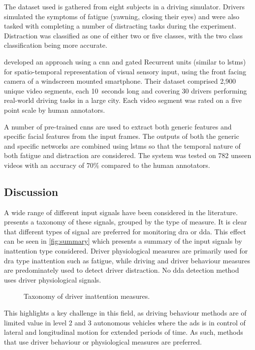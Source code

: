 \documentclass[11pt, parskip=half*,twoside=false]{scrbook}
\begin{document}
The dataset used is gathered from eight subjects in a driving simulator. Drivers simulated the symptoms of fatigue (yawning, closing their eyes) and were also tasked with completing a number of distracting tasks during the experiment. Distraction was classified as one of either two or five classes, with the two class classification being more accurate.

\citet{duaAutoRateHowAttentive2019} developed an approach using a \gls{cnn} and gated Recurrent units (similar to \glspl{lstm}) for spatio-temporal representation of visual sensory input, using the front facing camera of a windscreen mounted smartphone. Their dataset comprised 2,900 unique video segments, each 10~seconds long and covering 30 drivers performing real-world driving tasks in a large city. Each video segment was rated on a five point scale by human annotators. 

A number of pre-trained \glspl{cnn} are used to extract both generic features and specific facial features from the input frames. The outputs of both the generic and specific networks are combined using \glspl{lstm} so that the temporal nature of both fatigue and distraction are considered. The system was tested on 782 unseen videos with an accuracy of $70\%$ compared to the human annotators.

\subsection{Discussion} \label{ssec:analysis}
A wide range of different input signals have been considered in the literature.  presents a taxonomy of these signals, grouped by the type of measure. It is clear that different types of signal are preferred for monitoring \gls{dra} or \gls{dda}. This effect can be seen in \cref{fig:summary} which presents a summary of the input signals by inattention type considered. Driver physiological measures are primarily used for \gls{dra} type inattention such as fatigue, while driving and driver behaviour measures are predominately used to detect driver distraction. No \gls{dda} detection method uses driver physiological signals. 

\begin{figure}[h]
	\centering
	
	\caption{Taxonomy of driver inattention measures.}
	\label{fig:taxonomy_measures}
\end{figure}

This highlights a key challenge in this field, as driving behaviour methods are of limited value in level 2 and 3 autonomous vehicles where the \gls{ads} is in control of lateral and longitudinal motion for extended periods of time. As such, methods that use driver behaviour or physiological measures are preferred.
\end{document}
